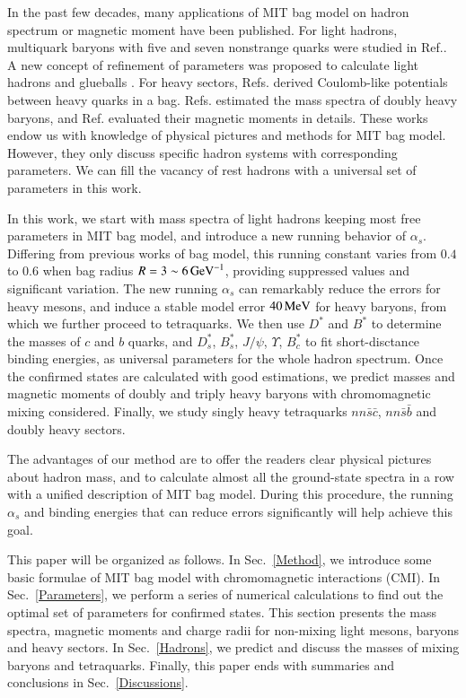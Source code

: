 \documentclass[prd,twocolumn,floatfix,nofootinbib]{revtex4}
\begin{document}
In the past few decades, many applications of MIT bag model on hadron spectrum or magnetic moment have been published.
For light hadrons, multiquark baryons with five and seven nonstrange quarks were studied in Ref.\cite{Strottman:1979qu}.
A new concept of refinement of parameters was proposed to calculate light hadrons and glueballs \cite{Carlson:1982er}.
For heavy sectors, Refs.\cite{Haxton:1980mc,Aerts:1980rf} derived Coulomb-like potentials between heavy quarks in a bag.
Refs.\cite{Fleck:1989mb,He:2004px} estimated the mass spectra of doubly heavy baryons, and Ref.\cite{Bernotas:2012nz} evaluated their magnetic moments in details.
These works endow us with knowledge of physical pictures and methods for MIT bag model. However, they only discuss specific hadron systems with corresponding parameters.
We can fill the vacancy of rest hadrons with a universal set of parameters in this work.

In this work, we start with mass spectra of light hadrons keeping most free parameters in MIT bag model, and introduce a new running behavior of $\alpha_{s}$.
Differing from previous works of bag model, this running constant varies from $0.4$ to $0.6$ when bag radius $R=3\sim 6\,{\rm {GeV}^{-1}}$, providing suppressed values and significant variation.
The new running $\alpha_{s}$ can remarkably reduce the errors for heavy mesons, and induce a stable model error $40\,{\rm MeV}$ for heavy baryons, from which we further proceed to tetraquarks.
We then use $D^{\ast}$ and $B^{\ast}$ to determine the masses of $c$ and $b$ quarks, and $D_{s}^{\ast}$, $B_{s}^{\ast}$, $J/\psi$, $\Upsilon$, $B_{c}^{\ast}$ to fit short-disctance binding energies, as universal parameters for the whole hadron spectrum.
Once the confirmed states are calculated with good estimations, we predict masses and magnetic moments of doubly and triply heavy baryons with chromomagnetic mixing considered.
Finally, we study singly heavy tetraquarks $nn\bar{s}\bar{c}$, $nn\bar{s}\bar{b}$ and doubly heavy sectors.

The advantages of our method are to offer the readers clear physical pictures about hadron mass, and to calculate almost all the ground-state spectra in a row with a unified description of MIT bag model.
During this procedure, the running $\alpha_{s}$ and binding energies that can reduce errors significantly will help achieve this goal.

This paper will be organized as follows. In Sec.~\ref{Method}, we introduce some basic formulae of MIT bag model with chromomagnetic interactions (CMI). 
In Sec.~\ref{Parameters}, we perform a series of numerical calculations to find out the optimal set of parameters for confirmed states. 
This section presents the mass spectra, magnetic moments and charge radii for non-mixing light mesons, baryons and heavy sectors. 
In Sec.~\ref{Hadrons}, we predict and discuss the masses of mixing baryons and tetraquarks. 
Finally, this paper ends with summaries and conclusions in Sec.~\ref{Discussions}.
\end{document}
